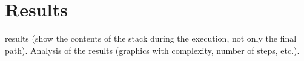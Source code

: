 \section{Results}
 results (show the contents of the stack during the execution, not only
the final path). Analysis of the results (graphics with complexity, number of steps, etc.).